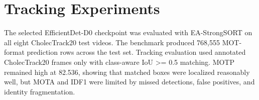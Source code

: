 \documentclass[12pt,a4paper]{report}
\begin{document}
\begin{table}[H]
\centering
\small
{}
\caption{Per-class AP at IoU threshold 0.5 for internal detector comparison.}
\label{tab:class_ap}
\end{table}
\begin{table}[H]
\centering
\small
{}
\caption{Detection AP across visual challenge subsets.}
\label{tab:challenge_ap}
\end{table}
\section{Tracking Experiments}
The selected EfficientDet-D0 checkpoint was evaluated with EA-StrongSORT on all eight CholecTrack20 test videos. The benchmark produced 768,555 MOT-format prediction rows across the test set. Tracking evaluation used annotated CholecTrack20 frames only with class-aware IoU >= 0.5 matching. MOTP remained high at 82.536, showing that matched boxes were localized reasonably well, but MOTA and IDF1 were limited by missed detections, false positives, and identity fragmentation.
\begin{table}[H]
\centering
\small
{}
\caption{EA-StrongSORT tracking metrics from the implemented evaluator.}
\label{tab:tracking_ours}
\end{table}
\end{document}
